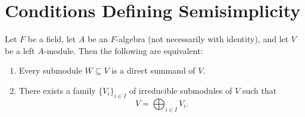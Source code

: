 \section{Conditions Defining Semisimplicity}

\begin{proposition}\label{prop:semisimple-no-unit}
    Let $F$ be a field, let $A$ be an $F$-algebra (not necessarily with identity), and let $V$ be a left $A$-module. Then the following are equivalent:
    \begin{enumerate}
        \item Every submodule $W \subseteq V$ is a direct summand of $V$.
        \item There exists a family $\{V_i\}_{i\in I}$ of irreducible submodules of $V$ such that
              \[
                  V=\bigoplus_{i\in I} V_i.
              \]
    \end{enumerate}
\end{proposition}

